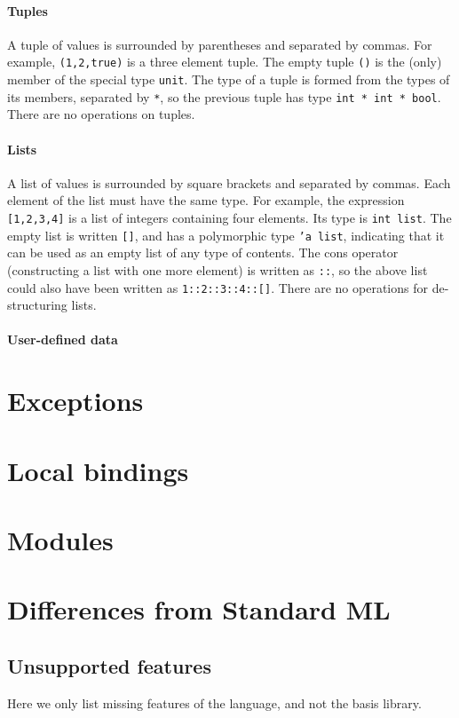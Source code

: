 \documentclass[12pt,a4paper]{book}
\begin{document}
\paragraph{Tuples} A tuple of values is surrounded by parentheses and separated by commas. For example, \texttt{(1,2,true)} is a three element tuple. The empty tuple \texttt{()} is the (only) member of the special type \texttt{unit}. The type of a tuple is formed from the types of its members, separated by \texttt{*}, so the previous tuple has type \texttt{int * int * bool}. There are no operations on tuples.

\paragraph{Lists} A list of values is surrounded by square brackets and separated by commas. Each element of the list must have the same type. For example, the expression \texttt{[1,2,3,4]} is a list of integers containing four elements. Its type is \texttt{int list}. The empty list is written \texttt{[]}, and has a polymorphic type \texttt{'a list}, indicating that it can be used as an empty list of any type of contents. The cons operator (constructing a list with one more element) is written as \texttt{::}, so the above list could also have been written as \texttt{1::2::3::4::[]}. There are no operations for de-structuring lists.

\paragraph{User-defined data}

\section{Exceptions}

\section{Local bindings}

\section{Modules}

\section{Differences from Standard ML}

\subsection{Unsupported features}
Here we only list missing features of the language, and not the basis library.
\end{document}
